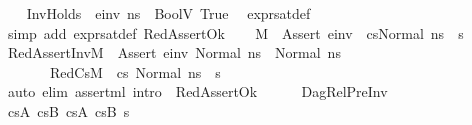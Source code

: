 \begin{isabellebody}
\ \ \isamarkupfalse%
\ InvHolds{\isacharcolon}{\kern0pt}{\isachardoublequoteopen}{\isasymLambda}{\isacharcomma}{\kern0pt}{\isasymGamma}{\isacharcomma}{\kern0pt}{\isasymOmega}\ {\isasymturnstile}\ {\isasymlangle}e{\isacharunderscore}{\kern0pt}inv{\isacharcomma}{\kern0pt}\ ns{}{\isasymrangle}\ {\isasymDown}\ BoolV\ True{\isachardoublequoteclose}\ \isamarkupfalse%
\ expr{\isacharunderscore}{\kern0pt}sat{\isacharunderscore}{\kern0pt}def\isanewline
\ \ \ \ \isamarkupfalse%
\ {\isacharparenleft}{\kern0pt}simp\ add{\isacharcolon}{\kern0pt}\ expr{\isacharunderscore}{\kern0pt}sat{\isacharunderscore}{\kern0pt}def\ RedAssertOk{\isacharparenright}{\kern0pt}\isanewline
\ \ \isamarkupfalse%
\ {\isacartoucheopen}M{\isacharcomma}{\kern0pt}{\isasymLambda}{\isacharcomma}{\kern0pt}{\isasymGamma}{\isacharcomma}{\kern0pt}{\isasymOmega}\ {\isasymturnstile}\ {\isasymlangle}Assert\ e{\isacharunderscore}{\kern0pt}inv\ {\isacharhash}{\kern0pt}\ cs{}{\isacharcomma}{\kern0pt}Normal\ ns{}{\isasymrangle}\ {\isacharbrackleft}{\kern0pt}{\isasymrightarrow}{\isacharbrackright}{\kern0pt}\ s{\isacharprime}{\kern0pt}{\isacartoucheclose}\isanewline
\ \ \isamarkupfalse%
\ RedAssertInv{\isacharcolon}{\kern0pt}{\isachardoublequoteopen}M{\isacharcomma}{\kern0pt}{\isasymLambda}{\isacharcomma}{\kern0pt}{\isasymGamma}{\isacharcomma}{\kern0pt}{\isasymOmega}\ {\isasymturnstile}\ {\isasymlangle}Assert\ e{\isacharunderscore}{\kern0pt}inv{\isacharcomma}{\kern0pt}\ Normal\ ns{}{\isasymrangle}\ {\isasymrightarrow}\ Normal\ ns{}{\isachardoublequoteclose}\ \ \isanewline
\ \ \ \ \ \ \ RedCs{}{\isacharcolon}{\kern0pt}{\isachardoublequoteopen}M{\isacharcomma}{\kern0pt}{\isasymLambda}{\isacharcomma}{\kern0pt}{\isasymGamma}{\isacharcomma}{\kern0pt}{\isasymOmega}\ {\isasymturnstile}\ {\isasymlangle}cs{}{\isacharcomma}{\kern0pt}\ Normal\ ns{}{\isasymrangle}\ {\isacharbrackleft}{\kern0pt}{\isasymrightarrow}{\isacharbrackright}{\kern0pt}\ s{\isacharprime}{\kern0pt}{\isachardoublequoteclose}\isanewline
\ \ \ \ \isamarkupfalse%
\ {\isacharparenleft}{\kern0pt}auto\ elim{\isacharcolon}{\kern0pt}\ assert{\isacharunderscore}{\kern0pt}ml\ intro{\isacharcolon}{\kern0pt}\ \ RedAssertOk{\isacharparenright}{\kern0pt}\ \ \isanewline
\ \ \isamarkupfalse%
\ DagRel{\isacharunderscore}{\kern0pt}PreInv\ \isamarkupfalse%
\ cs{}A\ cs{}B\ cs{}A\ cs{}B\ s{\isacharprime}{\kern0pt}{\isacharprime}{\kern0pt}\ \isanewline

\end{isabellebody}
